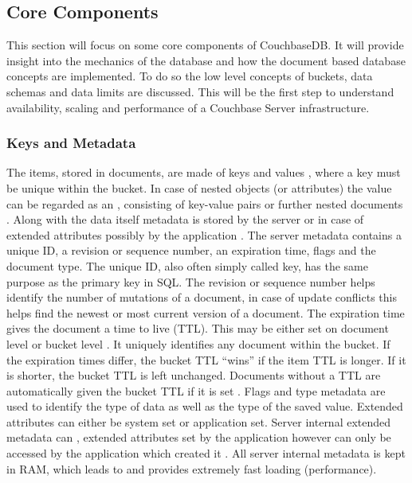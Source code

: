 \subsection{Core Components}
\label{couchbase:section:corecomponents}
This section will focus on some core components of CouchbaseDB. It will provide insight into the mechanics of the database and how the document based database concepts are implemented. To do so the low level concepts of buckets, data schemas and data limits are discussed. This will be the first step to understand availability, scaling and performance of a Couchbase Server infrastructure.
\subsubsection{Keys and Metadata}
The items, stored in documents, are made of keys and values \parencite{couchbaseDocuData}, where a key must be unique within the bucket. In case of nested objects (or attributes) the value can be regarded as an , consisting of key-value pairs or further nested documents \parencite{couchbaseDocuData}. 
Along with the data itself metadata is stored by the server \parencite{couchbaseDocuData} \parencite{objelean} or in case of extended attributes possibly by the application \parencite{couchbaseDocuData}. The server metadata contains a unique ID, a revision or sequence number, an expiration time, flags and the document type\parencite{couchbaseDocuData}. The unique ID, also often simply called key, has the same purpose as the primary key in SQL. The revision or sequence number helps identify the number of mutations of a document, in case of update conflicts this helps find the newest or most current version of a document. The expiration time gives the document a time to live (TTL). This may be either set on document level or bucket level \parencite{couchbaseDocuMemory}. It uniquely identifies any document within the bucket. If the expiration times differ, the bucket TTL \enquote{wins} if the item TTL is longer. If it is shorter, the bucket TTL is left unchanged. Documents without a TTL are automatically given the bucket TTL if it is set \parencite{couchbaseDocuExpiration}. Flags and type metadata are used to identify the type of data as well as the type of the saved value. Extended attributes can either be system set or application set. Server internal extended metadata can , extended attributes set by the application however can only be accessed by the application which created it \parencite{couchbaseDocuExtendedAttributes}. All server internal metadata is kept in RAM, which leads to  and provides extremely fast loading (performance).

